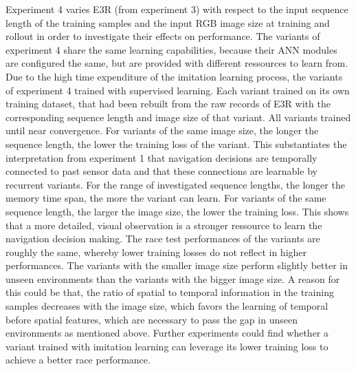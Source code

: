 Experiment 4 varies E3R (from experiment 3)
with respect to the input sequence length of the training samples
and the input RGB image size at training and rollout
in order to investigate their effects on performance.
The variants of experiment 4 
share the same learning capabilities, because their ANN modules are configured the same,
but are provided with different ressources to learn from.
Due to the high time expenditure of the imitation learning process, 
the variants of experiment 4 trained with supervised learning.
Each variant trained on its own training dataset,
that had been rebuilt from the raw records of E3R 
with the corresponding sequence length and image size of that variant.
All variants trained until near convergence.
For variants of the same image size,
the longer the sequence length,
the lower the training loss of the variant.
This substantiates the interpretation from experiment 1
that navigation decisions are temporally connected to past sensor data
and that these connections are learnable by recurrent variants.
For the range of investigated sequence lengths,
the longer the memory time span,
the more the variant can learn.
For variants of the same sequence length,
the larger the image size, the lower the training loss.
This shows that a more detailed, visual observation 
is a stronger ressource to learn the navigation decision making.
The race test performances of the variants are roughly the same,
whereby lower training losses do not reflect in higher performances.
The variants with the smaller image size perform 
slightly better in unseen environments than the 
variants with the bigger image size.
A reason for this could be that, the ratio
of spatial to temporal information in the training samples
decreases with the image size,
which favors the learning of temporal before spatial features,
which are necessary to pass the gap in unseen environments as mentioned above.
Further experiments
could find whether a variant
trained with imitation learning
can leverage its lower training loss
to achieve a better race performance.


































